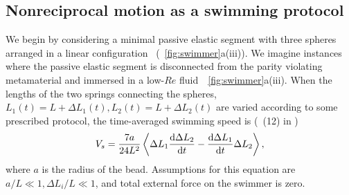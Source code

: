 \documentclass[
 preprint,
 preprintnumbers,
 amsmath,amssymb,
 aps,
 pre,
 longbibliography,
 superscriptaddress,
 10pt, twocolumn
]{revtex4-1}
\begin{document}
\subsection{Nonreciprocal motion as a swimming protocol}

 We begin by considering a minimal passive elastic segment with three spheres arranged in a linear configuration~\cite{Golestanian2008AnalyticResults} (\figurename~\ref{fig:swimmer}a(iii)). We imagine instances where the passive elastic segment is disconnected from the parity violating metamaterial and immersed in a low-$Re$ fluid~\figurename~\ref{fig:swimmer}a(iii). When the lengths of the two springs connecting the spheres, $L_1(t) = L+\Delta L_1(t), L_2(t) = L+\Delta L_2(t)$ are varied according to some prescribed protocol, the time-averaged swimming speed is (\eqnname~(12) in \cite{Golestanian2008AnalyticResults})
\begin{equation} \label{eqn:swimmer_speed}
    V_s = \frac{7a}{24L^2} \expval{\Delta L_1 \dv{\Delta L_2}{t} - \dv{\Delta L_1}{t} \Delta{L_2}},
\end{equation}
where $a$ is the radius of the bead. Assumptions for this equation are $a/L \ll 1, \Delta L_i/L \ll 1$, and total external force on the swimmer is zero.
\end{document}
